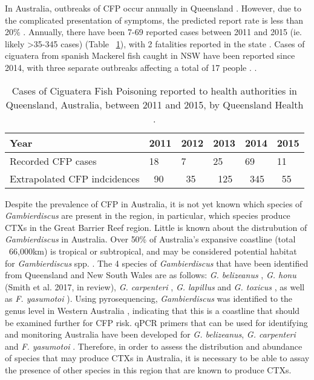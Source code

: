 \documentclass[12pt]{article}
\begin{document}
In Australia, outbreaks of CFP occur annually in Queensland \cite{qldcig}. However, due to the complicated presentation of symptoms, the predicted report rate is less than 20\% \citep{lewis2006ciguatera}. Annually, there have been 7-69 reported cases between 2011 and 2015 (ie. likely >35-345 cases) (Table ~\ref{tbl:CFPTable}), with 2 fatalities reported in the state \cite{tonge1967ciguatera}. Cases of ciguatera from spanish Mackerel fish caught in NSW have been reported since 2014, with three separate outbreaks affecting a total of 17 people \cite{farrellclinical}.
. %
\FloatBarrier
\begin{table}
\caption{Cases of Ciguatera Fish Poisoning reported to health authorities in Queensland, Australia, between 2011 and 2015, by Queensland Health \cite{qldcig}.}
\label{tbl:CFPTable}
\begin{tabular}{ | p{6cm} | p{1.5cm} | p{1.5cm}| p{1.5cm} | p{1.5cm} | p{1.5cm} | }
\hline
Year &2011&2012&2013&2014&2015\\
\hline
Recorded CFP cases&18&7&25&69&11\\
\hline
Extrapolated CFP indcidences&~90&~35&~125&~345&~55\\
\hline
\end{tabular}
\end{table}
\FloatBarrier
Despite the prevalence of CFP in Australia, it is not yet known which species of \textit{Gambierdiscus} are present in the region, in particular, which species produce CTXs in the Great Barrier Reef region. Little is known about the distrubution of \emph{Gambierdiscus} in Australia.
Over 50\% of Australia's expansive coastline (total ~66,000km) is tropical or subtropical, and may be considered potential habitat for \emph{Gambierdiscus} spp. \cite{kretzschmar2016characterization}. 
The 4 species of \emph{Gambierdiscus} that have been identified from Queensland and New South Wales are as follows: \emph{G. belizeanus} \citep{murray2014molecular}, \emph{G. honu} (Smith et al. 2017, in review), \emph{G. carpenteri} \citep{kohli2014high}, \emph{G. lapillus} \cite{kretzschmar2016characterization} and \emph{G. toxicus} \citep{hallegraeff2010algae}, as well as \emph{F. yasumotoi}  \citep{murray2014molecular}). Using pyrosequencing, \textit{Gambierdiscus} was identified to the genus level in Western Australia \citep{kohli2014cob}, indicating that this is a coastline that should be examined further for CFP risk. 
qPCR primers that can be used for identifying and monitoring Australia have been developed for \emph{G. belizeanus}, \emph{G. carpenteri} and \emph{F. yasumotoi} \citep{nishimura2016quantitative,vandersea2012development}. Therefore, in order to assess the distribution and abundance of species that may produce CTXs in Australia, it is necessary to be able to assay the presence of other species in this region that are known to produce CTXs.\\ 
\end{document}
